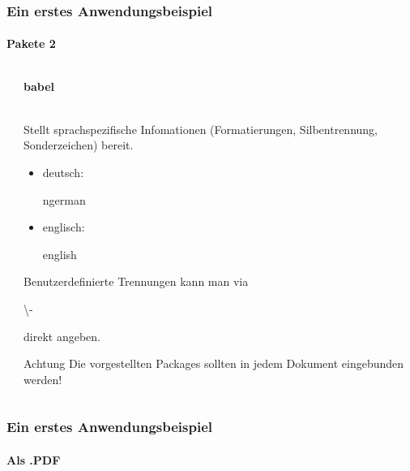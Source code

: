 
\begin{frame}
\frametitle{Ein erstes Anwendungsbeispiel}
\framesubtitle{Pakete 2}
\begin{columns}
\begin{column}{0.55\textwidth}
\begin{ttfamily}\footnotesize

 \normalsize
\end{ttfamily}
\end{column}
\begin{column}{0.45\textwidth}
\begin{ttfamily}\textbf{babel}\end{ttfamily}\\
Stellt sprachspezifische Infomationen (Formatierungen, Silbentrennung, Sonderzeichen) bereit.\\
\begin{itemize}
\item deutsch: \begin{ttfamily}ngerman\end{ttfamily}
\item englisch: \begin{ttfamily}english\end{ttfamily}
\end{itemize}
Benutzerdefinierte Trennungen kann man via {\begin{ttfamily} \color{unibaredI}\textbackslash - \end{ttfamily}} direkt angeben.\\

\begin{alertblock}{Achtung}
Die vorgestellten Packages sollten in jedem Dokument eingebunden werden!
\end{alertblock}
\end{column}
\end{columns}
\end{frame}


\begin{frame}
\frametitle{Ein erstes Anwendungsbeispiel}
\framesubtitle{Als .PDF}
\begin{columns}
\begin{column}{0.55\textwidth}
\begin{ttfamily}\footnotesize

 \normalsize
\end{ttfamily}
\end{column}

\begin{column}{0.45\textwidth}
\end{column}
\end{columns}
\end{frame}

